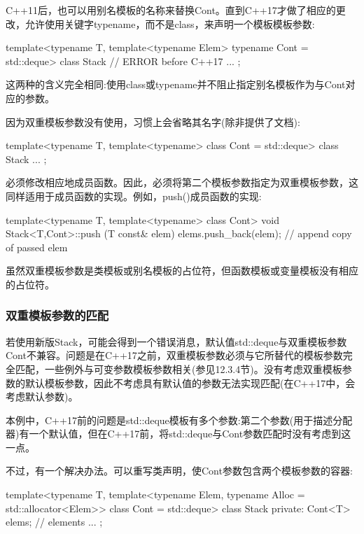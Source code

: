 C++11后，也可以用别名模板的名称来替换Cont。直到C++17才做了相应的更改，允许使用关键字typename，而不是class，来声明一个模板模板参数:

\begin{cpp}
template<typename T,
		template<typename Elem> typename Cont = std::deque>
class Stack { // ERROR before C++17
	...
};
\end{cpp}

这两种的含义完全相同:使用class或typename并不阻止指定别名模板作为与Cont对应的参数。

因为双重模板参数没有使用，习惯上会省略其名字(除非提供了文档):

\begin{cpp}
template<typename T,
		template<typename> class Cont = std::deque>
class Stack {
	...
};
\end{cpp}

必须修改相应地成员函数。因此，必须将第二个模板参数指定为双重模板参数，这同样适用于成员函数的实现。例如，push()成员函数的实现:

\begin{cpp}
template<typename T, template<typename> class Cont>
void Stack<T,Cont>::push (T const& elem)
{
	elems.push_back(elem); // append copy of passed elem
}
\end{cpp}

虽然双重模板参数是类模板或别名模板的占位符，但函数模板或变量模板没有相应的占位符。

\subsubsection{双重模板参数的匹配}

若使用新版Stack，可能会得到一个错误消息，默认值std::deque与双重模板参数Cont不兼容。问题是在C++17之前，双重模板参数必须与它所替代的模板参数完全匹配，一些例外与可变参数模板参数相关(参见12.3.4节)。没有考虑双重模板参数的默认模板参数，因此不考虑具有默认值的参数无法实现匹配(在C++17中，会考虑默认参数)。

本例中，C++17前的问题是std::deque模板有多个参数:第二个参数(用于描述分配器)有一个默认值，但在C++17前，将std::deque与Cont参数匹配时没有考虑到这一点。

不过，有一个解决办法。可以重写类声明，使Cont参数包含两个模板参数的容器:

\begin{cpp}
template<typename T,
	template<typename Elem,
		typename Alloc = std::allocator<Elem>>
	class Cont = std::deque>
class Stack {
private:
	Cont<T> elems; // elements
	...
};
\end{cpp}

